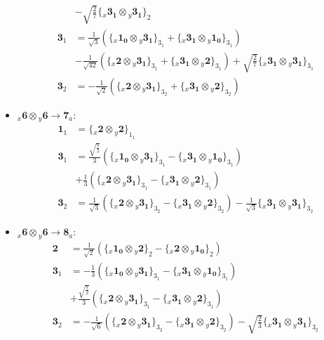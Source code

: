 \documentclass[english]{article}
\newcommand{\rep}[1]{\mathbf{#1}}
\newcommand{\repx}[2]{{}_{#2}\mathbf{#1}}
\newcommand{\subcg}[3]{\big\{ \repx{#1}{x}\otimes\repx{#2}{y}\big\}^{}_{#3}}
\begin{document}
\begin{itemize}
\begin{align*}
 & -\sqrt{\frac{2}{7}}\subcg{3_{1}}{3_{1}}{2}
\\
\rep{3}_{1} & = \frac{1}{\sqrt{3}}\left(\subcg{1_{0}}{3_{1}}{3_{1}}+\subcg{3_{1}}{1_{0}}{3_{1}}\right) \\ 
 & -\frac{1}{\sqrt{42}}\left(\subcg{2}{3_{1}}{3_{1}}+\subcg{3_{1}}{2}{3_{1}}\right)+\sqrt{\frac{2}{7}}\subcg{3_{1}}{3_{1}}{3_{1}}
\\
\rep{3}_{2} & = -\frac{1}{\sqrt{2}}\left(\subcg{2}{3_{1}}{3_{2}}+\subcg{3_{1}}{2}{3_{2}}\right)
\end{align*}
\item $\repx{6}{x}\otimes\repx{6}{y}\to\rep{7}_{a}$:
\begin{align*}
\rep{1}_{1} & = \subcg{2}{2}{1_{1}}
\\
\rep{3}_{1} & = \frac{\sqrt{\frac{7}{2}}}{3}\left(\subcg{1_{0}}{3_{1}}{3_{1}}-\subcg{3_{1}}{1_{0}}{3_{1}}\right) \\ 
 & +\frac{1}{3}\left(\subcg{2}{3_{1}}{3_{1}}-\subcg{3_{1}}{2}{3_{1}}\right)
\\
\rep{3}_{2} & = \frac{1}{\sqrt{3}}\left(\subcg{2}{3_{1}}{3_{2}}-\subcg{3_{1}}{2}{3_{2}}\right)-\frac{1}{\sqrt{3}}\subcg{3_{1}}{3_{1}}{3_{2}}
\end{align*}
\item $\repx{6}{x}\otimes\repx{6}{y}\to\rep{8}_{a}$:
\begin{align*}
\rep{2} & = \frac{1}{\sqrt{2}}\left(\subcg{1_{0}}{2}{2}-\subcg{2}{1_{0}}{2}\right)
\\
\rep{3}_{1} & = -\frac{1}{3}\left(\subcg{1_{0}}{3_{1}}{3_{1}}-\subcg{3_{1}}{1_{0}}{3_{1}}\right) \\ 
 & +\frac{\sqrt{\frac{7}{2}}}{3}\left(\subcg{2}{3_{1}}{3_{1}}-\subcg{3_{1}}{2}{3_{1}}\right)
\\
\rep{3}_{2} & = -\frac{1}{\sqrt{6}}\left(\subcg{2}{3_{1}}{3_{2}}-\subcg{3_{1}}{2}{3_{2}}\right)-\sqrt{\frac{2}{3}}\subcg{3_{1}}{3_{1}}{3_{2}}
\end{align*}
\end{itemize}
\end{document}
